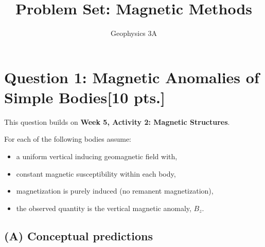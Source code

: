 \documentclass[11pt,a4paper]{article}
\title{Problem Set: Magnetic Methods}
\author{Geophysics 3A}
\date{}
\begin{document}
\maketitle

\section*{Question 1: Magnetic Anomalies of Simple Bodies\hfill [10 pts.]}

This question builds on \textbf{Week 5, Activity 2: Magnetic Structures}.

For each of the following bodies assume:
\begin{itemize}[itemsep=-0.5em]
    \item a uniform vertical inducing geomagnetic field with,
    \item constant magnetic susceptibility within each body,
    \item magnetization is purely induced (no remanent magnetization),
    \item the observed quantity is the vertical magnetic anomaly, $B_z$.
\end{itemize}

\subsection*{(A) Conceptual predictions}
\end{document}
